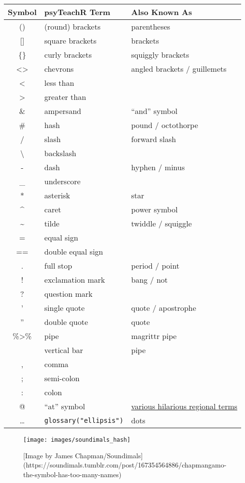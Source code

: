 \documentclass[
  oneside]{book}
\begin{document}
\begin{longtable}[]{@{}cll@{}}
\toprule
Symbol & psyTeachR Term & Also Known As \\
\midrule
\endhead
() & (round) brackets & parentheses \\
{[}{]} & square brackets & brackets \\
\{\} & curly brackets & squiggly brackets \\
\textless\textgreater{} & chevrons & angled brackets / guillemets \\
\textless{} & less than & \\
\textgreater{} & greater than & \\
\& & ampersand & ``and'' symbol \\
\# & hash & pound / octothorpe \\
/ & slash & forward slash \\
\textbackslash{} & backslash & \\
- & dash & hyphen / minus \\
\_ & underscore & \\
* & asterisk & star \\
\^{} & caret & power symbol \\
\textasciitilde{} & tilde & twiddle / squiggle \\
= & equal sign & \\
== & double equal sign & \\
. & full stop & period / point \\
! & exclamation mark & bang / not \\
? & question mark & \\
' & single quote & quote / apostrophe \\
'' & double quote & quote \\
\%\textgreater\% & pipe & magrittr pipe \\
\textbar{} & vertical bar & pipe \\
, & comma & \\
; & semi-colon & \\
: & colon & \\
@ & ``at'' symbol & \href{https://www.theguardian.com/notesandqueries/query/0,5753,-1773,00.html}{various hilarious regional terms} \\
\ldots{} & \texttt{glossary("ellipsis")} & dots \\
\bottomrule
\end{longtable}

\begin{figure}

{\centering \texttt{[image: images/soundimals\_hash]} 

}

\caption{[Image by James Chapman/Soundimals](https://soundimals.tumblr.com/post/167354564886/chapmangamo-the-symbol-has-too-many-names)}\label{fig:img-soundimals-hash}
\end{figure}
\end{document}
